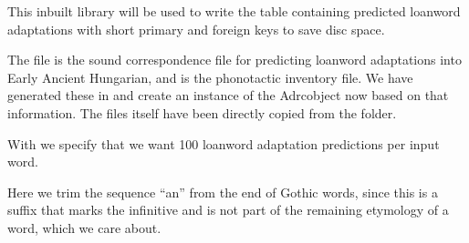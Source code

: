 \documentclass[letterpaper,10pt,english]{sphinxmanual}
\begin{document}
{{{{\begin{sphinxVerbatim}[commandchars=\\\{\}]
 
\end{sphinxVerbatim}

\sphinxAtStartPar
This inbuilt library will be used to write the table 
containing predicted loanword adaptations with short primary and foreign
keys to save disc space.

\begin{sphinxVerbatim}[commandchars=\\\{\}]
   
  
\end{sphinxVerbatim}

\sphinxAtStartPar
The file  is the sound correspondence file for
predicting loanword adaptations into Early Ancient Hungarian, and
 is the phonotactic inventory file.
We have generated these in 
and create an instance of the Adrc\sphinxhyphen{}object now based on that
information.
The files itself have been directly copied from the
 folder.

\sphinxAtStartPar
With  we specify that we want 100 loanword adaptation
predictions per input word.

\begin{sphinxVerbatim}[commandchars=\\\{\}]
 
       
         
       
\end{sphinxVerbatim}

\sphinxAtStartPar
Here we trim the sequence “an” from the end of Gothic words, since this
is a suffix that marks the infinitive and is not part of the remaining
etymology of a word, which we care about.

}}}}
\end{document}
